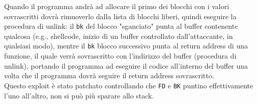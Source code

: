 Quando il programma andrà ad allocare il primo dei blocchi con i valori sovrascritti dovrà rimuoverlo dalla lista di blocchi liberi, quindi eseguire la procedura di unlink: il \texttt{bk} del blocco "sganciato" punta al buffer contenente qualcosa (e.g., shellcode, inizio di un buffer controllato dall'attaccante, in qualsiasi modo), mentre il \texttt{bk} blocco successivo punta al return address di una funzione, il quale verrà sovrascritto con l'indirizzo del buffer (procedura di unlink), portando il programma ad eseguire il codice all'interno del buffer una volta che il programma dovrà seguire il return address sovrascritto.\\

Questo exploit è stato patchato controllando che \texttt{FD} e \texttt{BK} puntino effettivamente l'uno all'altro, non si può più sparare allo stack.\\

